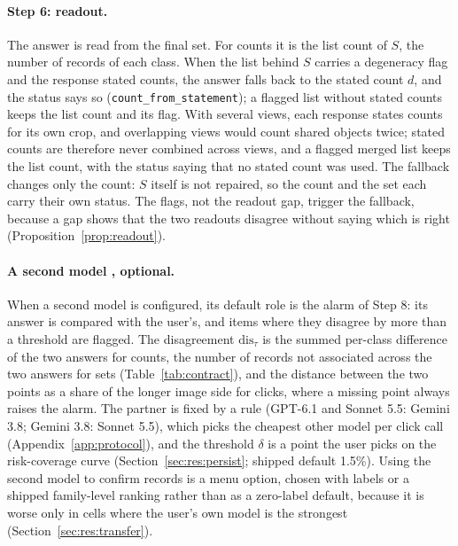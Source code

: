 \paragraph{Step 6: readout.} The answer is read from the final set. For counts it is the list count of $S$, the number of records of each class. When the list behind $S$ carries a degeneracy flag and the response stated counts, the answer falls back to the stated count $d$, and the status says so (\texttt{count\_from\_statement}); a flagged list without stated counts keeps the list count and its flag. With several views, each response states counts for its own crop, and overlapping views would count shared objects twice; stated counts are therefore never combined across views, and a flagged merged list keeps the list count, with the status saying that no stated count was used. The fallback changes only the count: $S$ itself is not repaired, so the count and the set each carry their own status. The flags, not the readout gap, trigger the fallback, because a gap shows that the two readouts disagree without saying which is right (Proposition~\ref{prop:readout}).

\paragraph{A second model , optional.} When a second model is configured, its default role is the alarm of Step 8: its answer is compared with the user's, and items where they disagree by more than a threshold are flagged. The disagreement $\mathrm{dis}_\tau$ is the summed per-class difference of the two answers for counts, the number of records not associated across the two answers for sets (Table~\ref{tab:contract}), and the distance between the two points as a share of the longer image side for clicks, where a missing point always raises the alarm. The partner is fixed by a rule (GPT-6.1 and Sonnet 5.5: Gemini 3.8; Gemini 3.8: Sonnet 5.5), which picks the cheapest other model per click call (Appendix~\ref{app:protocol}), and the threshold $\delta$ is a point the user picks on the risk-coverage curve (Section~\ref{sec:res:persist}; shipped default 1.5\%). Using the second model to confirm records is a menu option, chosen with labels or a shipped family-level ranking rather than as a zero-label default, because it is worse only in cells where the user's own model is the strongest (Section~\ref{sec:res:transfer}).

